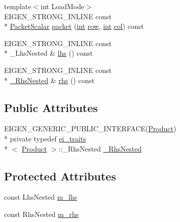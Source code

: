 \begin{DoxyCompactItemize}
\item 
{\footnotesize template$<$int Load\-Mode$>$ }\\E\-I\-G\-E\-N\-\_\-\-S\-T\-R\-O\-N\-G\-\_\-\-I\-N\-L\-I\-N\-E const \\*
\hyperlink{class_matrix_base_a58f32cd6a06433ee7a60efa03e99183a}{Packet\-Scalar} \hyperlink{class_product_a73ed64a8726d0c8865bd917db683ac4e}{packet} (\hyperlink{ioapi_8h_a787fa3cf048117ba7123753c1e74fcd6}{int} \hyperlink{glext_8h_a11b277b422822f784ee248b43eee3e1e}{row}, \hyperlink{ioapi_8h_a787fa3cf048117ba7123753c1e74fcd6}{int} \hyperlink{class_matrix_base_ae3c94b0f25b4273c7a8125169bdf60e0}{col}) const 
\item 
E\-I\-G\-E\-N\-\_\-\-S\-T\-R\-O\-N\-G\-\_\-\-I\-N\-L\-I\-N\-E const \\*
\-\_\-\-Lhs\-Nested \& \hyperlink{class_product_ac87bd6121c704869861f4535a64de124}{lhs} () const 
\item 
E\-I\-G\-E\-N\-\_\-\-S\-T\-R\-O\-N\-G\-\_\-\-I\-N\-L\-I\-N\-E const \\*
\hyperlink{class_product_a6bd9dcf946f54f28090951b0dc48c0f7}{\-\_\-\-Rhs\-Nested} \& \hyperlink{class_product_ad8b3e57239117bf53d6a93283cc72428}{rhs} () const 
\end{DoxyCompactItemize}
\subsection*{Public Attributes}
\begin{DoxyCompactItemize}
\item 
E\-I\-G\-E\-N\-\_\-\-G\-E\-N\-E\-R\-I\-C\-\_\-\-P\-U\-B\-L\-I\-C\-\_\-\-I\-N\-T\-E\-R\-F\-A\-C\-E(\hyperlink{class_product}{Product}) \\*
private typedef \hyperlink{structei__traits}{ei\-\_\-traits}\\*
$<$ \hyperlink{class_product}{Product} $>$\-::\-\_\-\-Rhs\-Nested \hyperlink{class_product_a6bd9dcf946f54f28090951b0dc48c0f7}{\-\_\-\-Rhs\-Nested}
\end{DoxyCompactItemize}
\subsection*{Protected Attributes}
\begin{DoxyCompactItemize}
\item 
const Lhs\-Nested \hyperlink{class_product_ab53fb2c36065209ef0e63910f1b20f60}{m\-\_\-lhs}
\item 
const Rhs\-Nested \hyperlink{class_product_acb2fc3355c62da64b8ddf4e7bec22ef8}{m\-\_\-rhs}
\end{DoxyCompactItemize}
